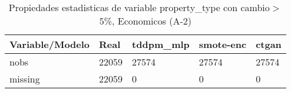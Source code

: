 \begin{table}[H]
\centering
\fontsize{8}{14}\selectfont
\caption{Propiedades estadisticas de variable property\_type con cambio\ensuremath{>}5\%, Economicos (A-2)}
\label{table-stats-economicos-a-2-property_type-short}
\begin{tabular}{|l|m{10em}|m{10em}|m{10em}|m{10em}|}
\hline
 \rowcolor[gray]{0.8}
Variable/Modelo & Real & tddpm\_mlp & smote-enc & ctgan \\
\hline nobs & 22059 & 27574 & 27574 & 27574 \\
\hline missing & 22059 & 0 & 0 & 0 \\
\hline
\end{tabular}
\end{table}
